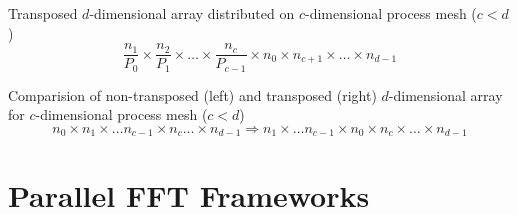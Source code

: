 Transposed $d$-dimensional array distributed on $c$-dimensional process mesh ($c<d$)
\begin{equation*}
  \frac{n_1}{P_0} \times \frac{n_2}{P_1} \times \hdots \times \frac{n_c}{P_{c-1}}  \times n_0 \times n_{c+1} \times \hdots \times n_{d-1}
\end{equation*}

Comparision of non-transposed (left) and transposed (right) $d$-dimensional array for $c$-dimensional process mesh ($c<d$)
\begin{equation*}
  n_0\times n_1\times \hdots n_{c-1} \times n_c \hdots \times n_{d-1} \Rightarrow n_1 \times \hdots n_{c-1} \times n_0 \times n_c \times \hdots \times n_{d-1}
\end{equation*}









% 




\section{Parallel FFT Frameworks}

